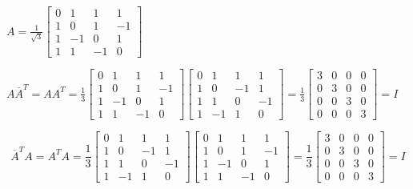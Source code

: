 \documentclass[11pt]{article}
\begin{document}
\begin{solution}
    $A = \frac{1}{\sqrt{3}}\begin{bmatrix}
        0 & 1 & 1 & 1 \\
        1 & 0 & 1 & -1 \\
        1 & -1 & 0 & 1 \\
        1 & 1 & -1 & 0
    \end{bmatrix}$
    
    $A \overline{A}^T = A A^T =  \frac{1}{3}\begin{bmatrix}
        0 & 1 & 1 & 1 \\
        1 & 0 & 1 & -1 \\
        1 & -1 & 0 & 1 \\
        1 & 1 & -1 & 0
    \end{bmatrix} \begin{bmatrix}
        0 & 1 & 1 & 1 \\
        1 & 0 & -1 & 1 \\
        1 & 1 & 0 & -1 \\
        1 & -1 & 1 & 0
    \end{bmatrix} = \frac{1}{3} \begin{bmatrix}
        3 & 0 & 0 & 0 \\
        0 & 3 & 0 & 0 \\
        0 & 0 & 3 & 0 \\
        0 & 0 & 0 & 3
    \end{bmatrix} = I$

    \[
     \overline{A}^T  A = A^T A  =  \frac{1}{3} \begin{bmatrix}
        0 & 1 & 1 & 1 \\
        1 & 0 & -1 & 1 \\
        1 & 1 & 0 & -1 \\
        1 & -1 & 1 & 0
    \end{bmatrix} \begin{bmatrix}
        0 & 1 & 1 & 1 \\
        1 & 0 & 1 & -1 \\
        1 & -1 & 0 & 1 \\
        1 & 1 & -1 & 0
    \end{bmatrix}  = \frac{1}{3} \begin{bmatrix}
        3 & 0 & 0 & 0 \\
        0 & 3 & 0 & 0 \\
        0 & 0 & 3 & 0 \\
        0 & 0 & 0 & 3
    \end{bmatrix} = I
    \]  
\end{solution}
\end{document}
